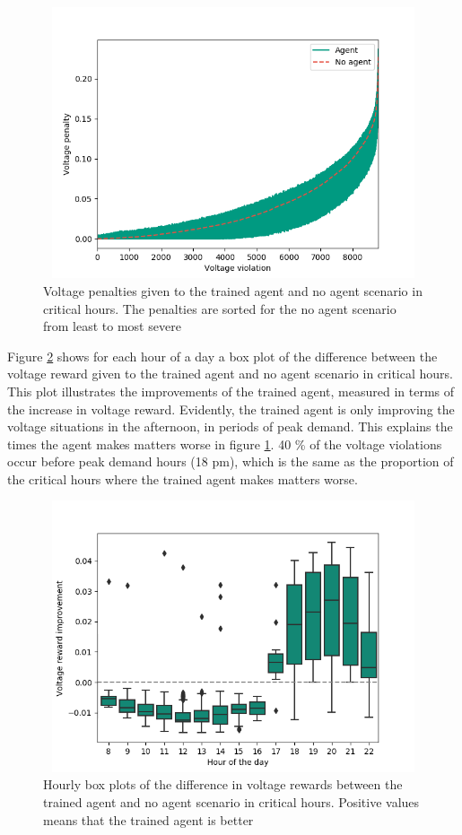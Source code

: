 \documentclass[class=book, crop=false, 11pt]{standalone}
\begin{document}
\begin{figure}[h]
    \center
\includegraphics[height=8cm, width=12cm]{figures/config1_sorted_voltage.png}
    \caption[size = 9]{Voltage penalties given to the trained agent and no agent scenario in critical hours. The penalties are sorted for the no agent scenario from least to most severe}
    \label{fig:results:config1_sorted_voltage}
\end{figure}


Figure \ref{fig:results:config1_improvement_voltage} shows for each hour of a day a box plot of the difference between the voltage reward given to the trained agent and no agent scenario in critical hours. This plot illustrates the improvements of the trained agent, measured in terms of the increase in voltage reward. Evidently, the trained agent is only improving the voltage situations in the afternoon, in periods of peak demand. This explains the times the agent makes matters worse in figure \ref{fig:results:config1_sorted_voltage}. 40 \% of the voltage violations occur before peak demand hours (18 pm), which is the same as the proportion of the critical hours where the trained agent makes matters worse. 

\begin{figure}[h]
    \center
\includegraphics[height=8cm, width=12cm]{figures/config1_improvement_voltage.png}
    \caption[size = 9]{Hourly box plots of the difference in voltage rewards between the trained agent and no agent scenario in critical hours. Positive values means that the trained agent is better}
    \label{fig:results:config1_improvement_voltage}
\end{figure}
\end{document}
